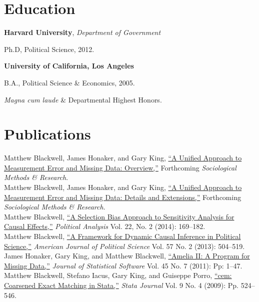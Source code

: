 \documentclass[margin,line]{res}
\newenvironment{list1}{
  \begin{list}{\ding{113}}{%
      \setlength{\itemsep}{0in}
      \setlength{\parsep}{0in} \setlength{\parskip}{0in}
      \setlength{\topsep}{0in} \setlength{\partopsep}{0in} 
      \setlength{\leftmargin}{0.83 cm}}}{\end{list}}
\begin{document}
\begin{resume}
\section{\sc Education}

{\bf Harvard University}, {\em Department of Government}
\begin{list1}
\item[] Ph.D, Political Science, 2012. 
\end{list1}
{\bf University of California, Los Angeles}
\begin{list1}
\item[] B.A., Political Science \& Economics, 2005.
\item[] \emph{Magna cum laude} \& Departmental Highest Honors.
\end{list1}

\section{\sc Publications}
Matthew Blackwell, James Honaker, and Gary King, \href{http://gking.harvard.edu/files/measure.pdf}{``A Unified Approach to Measurement Error and
Missing Data: Overview,''} Forthcoming \emph{Sociological Methods \& Research}.\vspace{1em}\\
Matthew Blackwell, James Honaker, and Gary King, \href{http://gking.harvard.edu/files/measured.pdf}{``A Unified Approach to Measurement Error and
Missing Data: Details and Extensions,''} Forthcoming \emph{Sociological Methods \& Research}.\vspace{1em}\\
Matthew Blackwell, \href{http://gking.harvard.edu/files/sens.pdf}{``A Selection Bias Approach to Sensitivity
Analysis for Causal Effects,''} \emph{Political Analysis} Vol. 22, No. 2 (2014): 169--182.\vspace{1em}\\
Matthew Blackwell,
\href{http://mattblackwell.org/files/papers/dynci.pdf}{``A Framework
  for Dynamic Causal Inference in Political Science,''}
\emph{American Journal of Political Science} Vol. 57 No. 2 (2013): 504--519.\vspace{1em}\\
James Honaker, Gary King, and Matthew Blackwell, \href{http://www.mattblackwell.org/files/papers/amelia-jss.pdf}{``Amelia II: A
Program for Missing Data,''} \emph{Journal of Statistical Software}
Vol. 45 No. 7 (2011): Pp: 1--47.
\vspace{1em}\\
Matthew Blackwell, Stefano Iacus, Gary King, and Guiseppe Porro, \href{http://www.mattblackwell.org/files/papers/cemStata.pdf}{``cem: Coarsened Exact Matching in Stata,''} \emph{Stata
  Journal} Vol. 9 No. 4 (2009): Pp. 524--546.


\end{resume}
\end{document}

